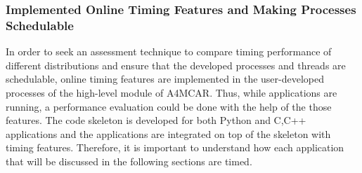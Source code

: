 \subsubsection{Implemented Online Timing Features and Making Processes Schedulable} \label{onlinetiming}
In order to seek an assessment technique to compare timing performance of different distributions and ensure that the developed processes and threads are schedulable, online timing features are implemented in the user-developed processes of the high-level module of A4MCAR. Thus, while applications are running, a performance evaluation could be done with the help of the those features. The code skeleton is developed for both Python and C,C++ applications and the applications are integrated on top of the skeleton with timing features. Therefore, it is important to understand how each application that will be discussed in the following sections are timed.

